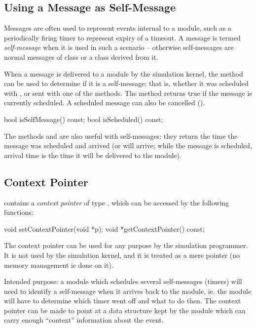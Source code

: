 \subsection{Using a Message as Self-Message}
\label{sec:messages:using-message-as-self-message}

Messages are often used to represent events internal to a module,
such as a periodically firing timer to represent expiry of a timeout.
A message is termed \textit{self-message} when it is used
in such a scenario -- otherwise self-messages are normal messages
of class  or a class derived from it.

When a message is delivered to a module by the simulation kernel, the
 method can be used to determine if it is
a self-message; that is, whether it was scheduled with ,
or sent with one of the  methods. The 
method returns true if the message is currently scheduled. A scheduled
message can also be cancelled ().

\begin{cpp}
bool isSelfMessage() const;
bool isScheduled() const;
\end{cpp}

The methods  and  are also
useful with self-messages: they return the time the message was scheduled
and arrived (or will arrive; while the message is scheduled, arrival time
is the time it will be delivered to the module).


\subsection{Context Pointer}
\label{sec:messages:context-pointer}

 contains a \textit{context pointer} of type ,
which can be accessed by the following functions:

\begin{cpp}
void setContextPointer(void *p);
void *getContextPointer() const;
\end{cpp}

The context pointer can be used for any purpose by the simulation programmer.
It is not used by the simulation kernel, and it is treated as
a mere pointer (no memory management is done on it).

Intended purpose: a module which schedules several self-messages (timers)
will need to identify a self-message when it arrives back to the module,
ie. the module will have to determine which timer went off and what to do
then. The context pointer can be made to point at a data structure kept by
the module which can carry enough ``context'' information about the event.



